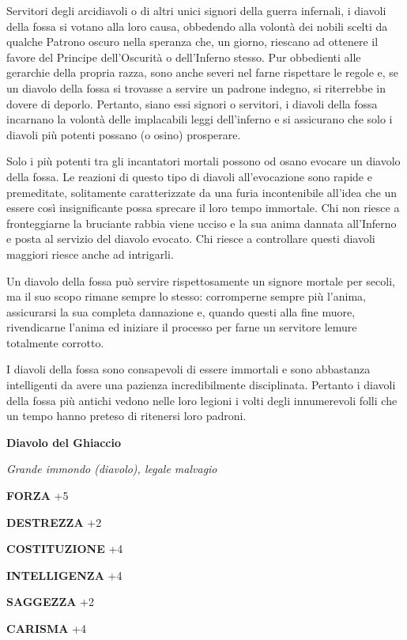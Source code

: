 \begin{multicols}{2}
Servitori degli arcidiavoli o di altri unici signori della guerra infernali, i diavoli della fossa si votano alla loro causa, obbedendo alla volontà dei nobili scelti da qualche Patrono oscuro nella speranza che, un giorno, riescano ad ottenere il favore del Principe dell'Oscurità o dell'Inferno stesso. Pur obbedienti alle gerarchie della propria razza, sono anche severi nel farne rispettare le regole e, se un diavolo della fossa si trovasse a servire un padrone indegno, si riterrebbe in dovere di deporlo. Pertanto, siano essi signori o servitori, i diavoli della fossa incarnano la volontà delle implacabili leggi dell'inferno e si assicurano che solo i diavoli più potenti possano (o osino) prosperare.

Solo i più potenti tra gli incantatori mortali possono od osano evocare un diavolo della fossa. Le reazioni di questo tipo di diavoli all'evocazione sono rapide e premeditate, solitamente caratterizzate da una furia incontenibile all'idea che un essere così insignificante possa sprecare il loro tempo immortale. Chi non riesce a fronteggiarne la bruciante rabbia viene ucciso e la sua anima dannata all'Inferno e posta al servizio del diavolo evocato. Chi riesce a controllare questi diavoli maggiori riesce anche ad intrigarli.

Un diavolo della fossa può servire rispettosamente un signore mortale per secoli, ma il suo scopo rimane sempre lo stesso: corromperne sempre più l'anima, assicurarsi la sua completa dannazione e, quando questi alla fine muore, rivendicarne l'anima ed iniziare il processo per farne un servitore lemure totalmente corrotto.

I diavoli della fossa sono consapevoli di essere immortali e sono abbastanza intelligenti da avere una pazienza incredibilmente disciplinata. Pertanto i diavoli della fossa più antichi vedono nelle loro legioni i volti degli innumerevoli folli che un tempo hanno preteso di ritenersi loro padroni.


\medskip{}\textbf{Diavolo del Ghiaccio}

\textit{Grande immondo (diavolo), legale malvagio}

\textbf{FORZA} +5

\textbf{DESTREZZA} +2

\textbf{COSTITUZIONE} +4

\textbf{INTELLIGENZA} +4

\textbf{SAGGEZZA} +2

\textbf{CARISMA} +4


\end{multicols}

